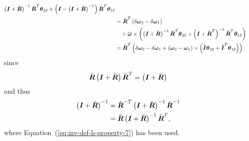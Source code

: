 \documentclass[10pt,dvips,fleqn]{report}
\newcommand{\T}[1]{\boldsymbol{#1}}
\begin{document}
\begin{align}
{		\plbr{\T{I} + \tilde{\T{R}}}^{-1} \hat{\T{R}}^T \T{\theta}_{2\delta}
		+ \plbr{\T{I} - \plbr{\T{I} + \tilde{\T{R}}}^{-1}} \hat{\T{R}}^T \T{\theta}_{1\delta}
	} \\
	&= \hat{\T{R}}^T \plbr{
		\delta\T{\omega}_2 - \delta\T{\omega}_1
	} \nonumber \\
	& \mbox{\hspace{10pt}} + \overline{\T{\omega}} \times \plbr{
		\plbr{\T{I} + \tilde{\T{R}}}^{-1} \hat{\T{R}}^T \T{\theta}_{2\delta}
		+ \plbr{\T{I} + \tilde{\T{R}}^T}^{-1} \hat{\T{R}}^T \T{\theta}_{1\delta}
	} \\
	&= \hat{\T{R}}^T \plbr{
		\delta\T{\omega}_2 - \delta\T{\omega}_1
	+ \plbr{\T{\omega}_2 - \T{\omega}_1} \times \plbr{
		\hat{\T{I}} \T{\theta}_{2\delta}
		+ \hat{\T{I}}^T \T{\theta}_{1\delta}
	}}
	\label{eq:inv-deformable-hinge-omega-rel-delta}
\end{align}
since
\begin{equation}
	\tilde{\T{R}}\plbr{\T{I} + \tilde{\T{R}}} \tilde{\T{R}}^T = \plbr{\T{I} + \tilde{\T{R}}}
\end{equation}
and thus
\begin{align}
	\plbr{\T{I} + \tilde{\T{R}}}^{-1}
	&= \tilde{\T{R}}^{-T} \plbr{\T{I} + \tilde{\T{R}}}^{-1} \tilde{\T{R}}^{-1} \\
	&= \tilde{\T{R}} \plbr{\T{I} + \tilde{\T{R}}}^{-1} \tilde{\T{R}}^T ,
\end{align}
where Equation~(\ref{eq:inv-def-h-property-7}) has been used.
\end{document}
